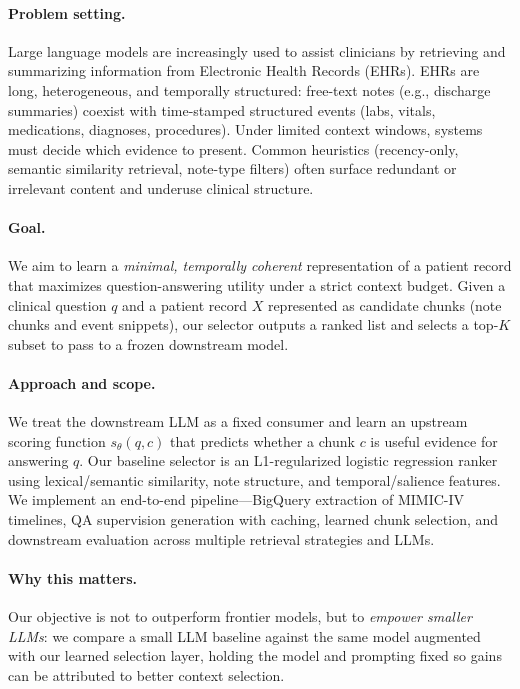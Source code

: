 \paragraph{Problem setting.}
Large language models are increasingly used to assist clinicians by retrieving and summarizing information from Electronic Health Records (EHRs). EHRs are long, heterogeneous, and temporally structured: free-text notes (e.g., discharge summaries) coexist with time-stamped structured events (labs, vitals, medications, diagnoses, procedures). Under limited context windows, systems must decide which evidence to present. Common heuristics (recency-only, semantic similarity retrieval, note-type filters) often surface redundant or irrelevant content and underuse clinical structure.

\paragraph{Goal.}
We aim to learn a \emph{minimal, temporally coherent} representation of a patient record that maximizes question-answering utility under a strict context budget. Given a clinical question $q$ and a patient record $X$ represented as candidate chunks (note chunks and event snippets), our selector outputs a ranked list and selects a top-$K$ subset to pass to a frozen downstream model.

\paragraph{Approach and scope.}
We treat the downstream LLM as a fixed consumer and learn an upstream scoring function $s_\theta(q,c)$ that predicts whether a chunk $c$ is useful evidence for answering $q$. Our baseline selector is an L1-regularized logistic regression ranker using lexical/semantic similarity, note structure, and temporal/salience features. We implement an end-to-end pipeline---BigQuery extraction of MIMIC-IV timelines, QA supervision generation with caching, learned chunk selection, and downstream evaluation across multiple retrieval strategies and LLMs.

\paragraph{Why this matters.}
Our objective is not to outperform frontier models, but to \emph{empower smaller LLMs}: we compare a small LLM baseline against the same model augmented with our learned selection layer, holding the model and prompting fixed so gains can be attributed to better context selection.